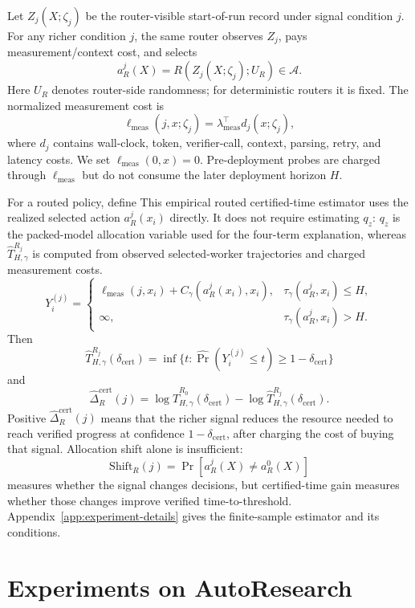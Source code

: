 \documentclass{article}
\newcommand{\newtext}[1]{\textcolor{green!50!black}{#1}}
\newcommand{\cA}{\mathcal{A}}
\begin{document}
{\color{green!50!black}
Let \(Z_j(X;\zeta_j)\) be the router-visible start-of-run record under signal condition
\(j\). For any richer condition \(j\), the same router observes \(Z_j\), pays measurement/context cost, and selects
\[
    a_R^j(X)=R(Z_j(X;\zeta_j);U_R)\in\cA .
\]
Here \(U_R\) denotes router-side randomness; for deterministic routers it is fixed.
The normalized measurement cost is
\[
    \ell_{\mathrm{meas}}(j,x;\zeta_j)
    =
    \lambda_{\mathrm{meas}}^\top d_j(x;\zeta_j),
\]
where \(d_j\) contains wall-clock, token, verifier-call, context, parsing, retry, and latency
costs.  We set \(\ell_{\mathrm{meas}}(0,x)=0\).  Pre-deployment probes are charged through
\(\ell_{\mathrm{meas}}\) but do not consume the later deployment horizon \(H\).

For a routed policy, define
\newtext{This empirical routed certified-time estimator uses the realized selected action \(a_R^j(x_i)\) directly. It does not require estimating \(q_z\): \(q_z\) is the packed-model allocation variable used for the four-term explanation, whereas \(\widehat T^{R_j}_{H,\gamma}\) is computed from observed selected-worker trajectories and charged measurement costs.}
\[
Y_i^{(j)}
=
\begin{cases}
\ell_{\mathrm{meas}}(j,x_i)+C_\gamma(a_R^j(x_i),x_i),
& \tau_\gamma(a_R^j,x_i)\le H,\\
\infty,
& \tau_\gamma(a_R^j,x_i)>H.
\end{cases}
\]
Then
\[
\widehat T^{R_j}_{H,\gamma}(\delta_{\mathrm{cert}})
=
\inf\{t:\widehat{\Pr}(Y_i^{(j)}\le t)\ge 1-\delta_{\mathrm{cert}}\}
\label{eq:router-objective}
\]
and
\begin{equation}
\widehat\Delta_R^{\mathrm{cert}}(j)
=
\log \widehat T^{R_0}_{H,\gamma}(\delta_{\mathrm{cert}})
-
\log \widehat T^{R_j}_{H,\gamma}(\delta_{\mathrm{cert}}).
\label{eq:router-gain}
\end{equation}
Positive \(\widehat\Delta_R^{\mathrm{cert}}(j)\) means that the richer signal reduces the resource needed to reach verified progress at confidence \(1-\delta_{\mathrm{cert}}\), after charging the cost of buying that signal.
Allocation shift alone is insufficient:
\[
    \mathrm{Shift}_R(j)
    =
    \Pr[a_R^j(X)\neq a_R^0(X)]
\]
measures whether the signal changes decisions, but certified-time gain measures whether those changes improve verified time-to-threshold.
Appendix~\ref{app:experiment-details} gives the finite-sample estimator and its conditions.
}


\section{Experiments on AutoResearch}
\label{sec:experiments}
\end{document}
